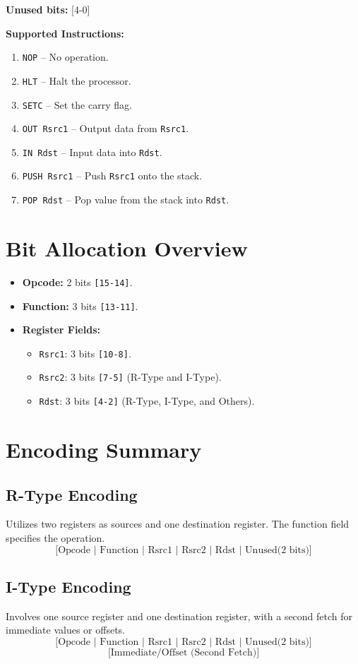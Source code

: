 \documentclass{report}
\begin{document}
\textbf{Unused bits:} [4-0]

\textbf{Supported Instructions:}
\begin{enumerate}
    \item \texttt{NOP} – No operation.
    \item \texttt{HLT} – Halt the processor.
    \item \texttt{SETC} – Set the carry flag.
    \item \texttt{OUT Rsrc1} – Output data from \texttt{Rsrc1}.
    \item \texttt{IN Rdst} – Input data into \texttt{Rdst}.
    \item \texttt{PUSH Rsrc1} – Push \texttt{Rsrc1} onto the stack.
    \item \texttt{POP Rdst} – Pop value from the stack into \texttt{Rdst}.
\end{enumerate}

\section*{Bit Allocation Overview}
\begin{itemize}
    \item \textbf{Opcode:} 2 bits \texttt{[15-14]}.
    \item \textbf{Function:} 3 bits \texttt{[13-11]}.
    \item \textbf{Register Fields:}
    \begin{itemize}
        \item \texttt{Rsrc1}: 3 bits \texttt{[10-8]}.
        \item \texttt{Rsrc2}: 3 bits \texttt{[7-5]} (R-Type and I-Type).
        \item \texttt{Rdst}: 3 bits \texttt{[4-2]} (R-Type, I-Type, and Others).
    \end{itemize}
\end{itemize}

\section*{Encoding Summary}
\subsection*{R-Type Encoding}
Utilizes two registers as sources and one destination register. The function field specifies the operation.
\[
\text{[Opcode | Function | Rsrc1 | Rsrc2 | Rdst | Unused(2 bits)]}
\]

\subsection*{I-Type Encoding}
Involves one source register and one destination register, with a second fetch for immediate values or offsets.
\[
\text{[Opcode | Function | Rsrc1 | Rsrc2 | Rdst | Unused(2 bits)]}
\]
\[
\text{[Immediate/Offset (Second Fetch)]}
\]
\end{document}
